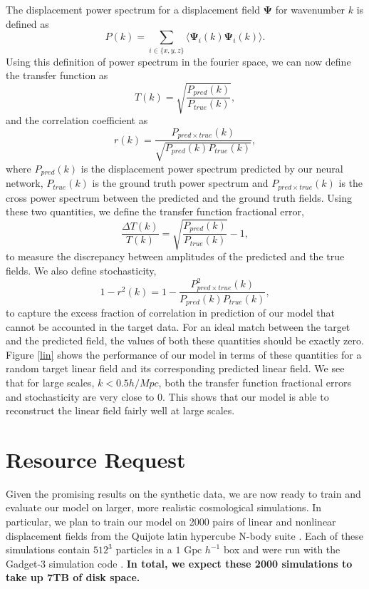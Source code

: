 \documentclass[11pt]{article}
\begin{document}
The displacement power spectrum for a displacement field $\mathbf{\Psi}$ for wavenumber $k$ is defined as
$$
P(k) = \sum_{i \in \{x,y,z\}}\langle\mathbf{\Psi}_i(k)\mathbf{\Psi}_i(k)\rangle.
$$
Using this definition of power spectrum in the fourier space, we can now define the transfer function as
$$
T(k) = \sqrt{\frac{P_{pred}(k)}{P_{true}(k)}},
$$
and the correlation coefficient as
$$
r(k) = \frac{P_{pred \times true}(k)}{\sqrt{P_{pred}(k)P_{true}(k)}},
$$
where $P_{pred}(k)$ is the displacement power spectrum predicted by our neural network, $P_{true}(k)$ is the ground truth power spectrum and $P_{pred \times true}(k)$ is the cross power spectrum between the predicted and the ground truth fields. Using these two quantities, we define the transfer function fractional error,
$$
\frac{\Delta T(k)}{T(k)} = \sqrt{\frac{P_{pred}(k)}{P_{true}(k)}}-1,
$$
to measure the discrepancy between amplitudes of the predicted and the true fields. We also define stochasticity,
$$
1 - r^2(k) = 1 - \frac{P^2_{pred \times true}(k)}{{P_{pred}(k)P_{true}(k)}},
$$
to capture the excess fraction of correlation in prediction of our model that cannot be accounted in the target data. For an ideal match between the target and the predicted field, the values of both these quantities should be exactly zero. Figure \ref{lin} shows the performance of our model in terms of these quantities for a random target linear field and its corresponding predicted linear field. We see that for large scales, $k < 0.5 h/Mpc$, both the transfer function fractional errors and stochasticity are very close to $0$. This shows that our model is able to reconstruct the linear field fairly well at large scales.

\section{Resource Request}

Given the promising results on the synthetic data, we are now ready to train and evaluate our model on larger, more realistic cosmological simulations. In particular, we plan to train our model on 2000 pairs of linear and nonlinear displacement fields from the Quijote latin hypercube N-body suite \cite{quijote}. Each of these simulations contain $512^3$ particles in a $1 \text{ Gpc } h^{-1}$ box and were run with the Gadget-3 simulation code \cite{gadget-3}. \textbf{In total, we expect these 2000 simulations to take up 7TB of disk space.}
\end{document}

